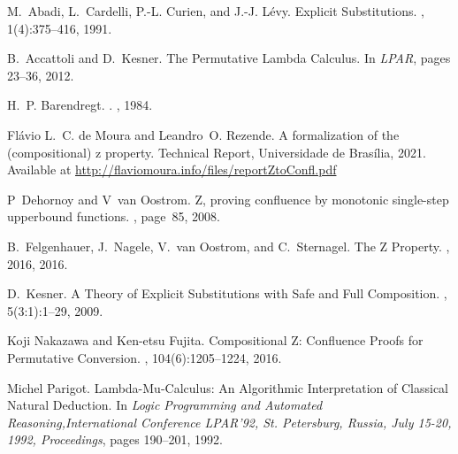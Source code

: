 \documentclass[a4paper]{article}
\begin{document}
% 
%


\begin{thebibliography}{FNvOS16}

M.~Abadi, L.~Cardelli, P.-L. Curien, and J.-J. L{\'e}vy.
\newblock Explicit {{Substitutions}}.
, 1(4):375--416, 1991.

B.~Accattoli and D.~Kesner.
\newblock The {{Permutative Lambda Calculus}}.
\newblock In {\em {{LPAR}}}, pages 23--36, 2012.

H.~P. Barendregt.
.
, 1984.

Fl{\'a}vio L.~C. {de Moura} and Leandro~O. Rezende.
\newblock A formalization of the (compositional) z property.
\newblock Technical {{Report}}, {Universidade de Bras\'ilia},
2021.
\newblock Available at \url{http://flaviomoura.info/files/reportZtoConfl.pdf}

P~Dehornoy and V~{van Oostrom}.
\newblock Z, proving confluence by monotonic single-step upperbound functions.
, page~85,
  2008.

B.~Felgenhauer, J.~Nagele, V.~van Oostrom, and C.~Sternagel.
\newblock The {{Z Property}}.
, 2016, 2016.

D.~Kesner.
\newblock A {{Theory}} of {{Explicit Substitutions}} with {{Safe}} and {{Full
  Composition}}.
, 5(3:1):1--29, 2009.

Koji Nakazawa and Ken-etsu Fujita.
\newblock Compositional {{Z}}: {{Confluence Proofs}} for {{Permutative
  Conversion}}.
, 104(6):1205--1224, 2016.

Michel Parigot.
\newblock Lambda-{{Mu}}-{{Calculus}}: {{An Algorithmic Interpretation}} of
  {{Classical Natural Deduction}}.
\newblock In {\em Logic {{Programming}} and {{Automated
  Reasoning}},{{International Conference LPAR}}'92, {{St}}. {{Petersburg}},
  {{Russia}}, {{July}} 15-20, 1992, {{Proceedings}}}, pages 190--201, 1992.


\end{thebibliography}
\end{document}

